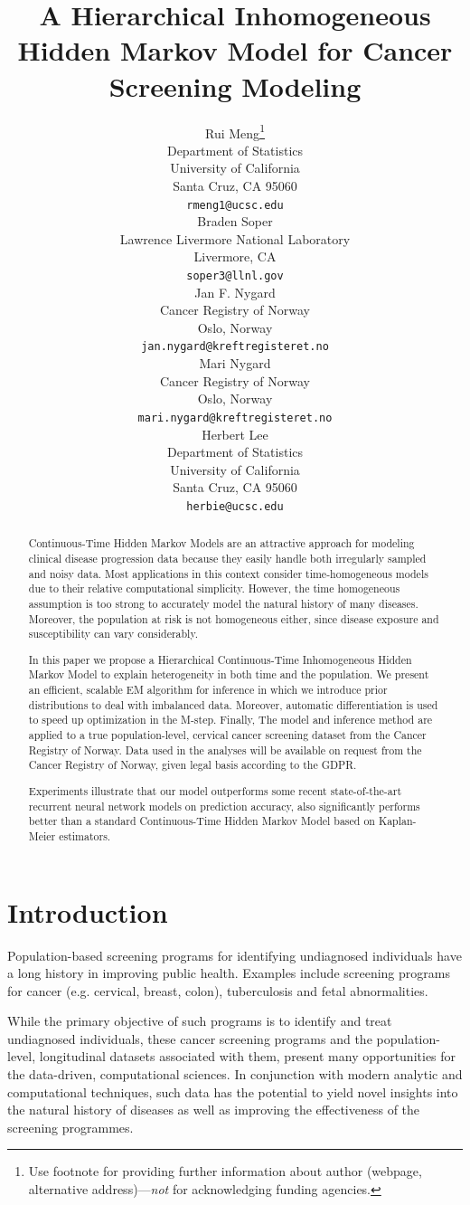 \documentclass{article}
\title{A Hierarchical Inhomogeneous Hidden Markov Model for Cancer Screening Modeling}
\author{%
  Rui Meng\thanks{Use footnote for providing further information
    about author (webpage, alternative address)---\emph{not} for acknowledging
    funding agencies.} \\
  Department of Statistics\\
  University of California\\
  Santa Cruz, CA 95060 \\
  \texttt{rmeng1@ucsc.edu} \\
   \And
   Braden Soper \\
   Lawrence Livermore National Laboratory \\
   Livermore, CA \\
   \texttt{soper3@llnl.gov} \\
   \AND
   Jan F. Nygard \\
   Cancer Registry of Norway \\
   Oslo, Norway \\
   \texttt{jan.nygard@kreftregisteret.no} \\
   \And
   Mari Nygard \\
   Cancer Registry of Norway \\
   Oslo, Norway \\
   \texttt{mari.nygard@kreftregisteret.no} \\
   \And
   Herbert Lee \\
   Department of Statistics\\
   University of California\\
   Santa Cruz, CA 95060 \\
   \texttt{herbie@ucsc.edu} \\
}
\begin{document}
\maketitle

\begin{abstract}
 Continuous-Time Hidden Markov Models are an attractive approach for modeling clinical disease progression data because they easily handle both irregularly sampled and noisy data. Most applications in this context consider time-homogeneous models due to their relative computational simplicity. However, the time homogeneous assumption is too strong to accurately model the natural history of many diseases. Moreover, the population at risk is not homogeneous either, since disease exposure and susceptibility can vary considerably. 
 
 In this paper we propose a Hierarchical Continuous-Time Inhomogeneous Hidden Markov Model to explain heterogeneity in both time and the population. We present an efficient, scalable EM algorithm for inference in which we introduce prior distributions to deal with imbalanced data. Moreover, automatic differentiation is used  to speed up optimization in the M-step. Finally, The model and inference method are applied to a true population-level, cervical cancer screening dataset from the Cancer Registry of Norway. Data used in the analyses will be available on request from the Cancer Registry of Norway, given legal basis according to the GDPR.
 
 Experiments illustrate that our model outperforms some recent state-of-the-art recurrent neural network models on prediction accuracy, also significantly performs better than a standard Continuous-Time Hidden Markov Model based on Kaplan-Meier estimators.
\end{abstract}

\section{Introduction}
Population-based screening programs for identifying undiagnosed individuals have a long history in improving public health. Examples include screening programs for cancer (e.g. cervical, breast, colon), tuberculosis and fetal abnormalities.  

While the primary objective of such programs is to identify and treat undiagnosed individuals, these cancer screening programs and the population-level, longitudinal datasets associated with them,  present many opportunities for the data-driven, computational sciences. 
In conjunction with modern analytic and computational techniques, such data has the potential to yield novel insights into the natural history of diseases as well as improving the effectiveness of the screening programmes. 
\end{document}
